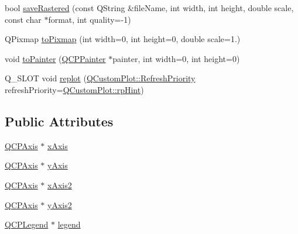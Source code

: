 \begin{DoxyCompactItemize}
\item 
bool \mbox{\hyperlink{class_q_custom_plot_ab528b84cf92baabe29b1d0ef2f77c93e}{save\+Rastered}} (const Q\+String \&file\+Name, int width, int height, double scale, const char $\ast$format, int quality=-\/1)
\item 
Q\+Pixmap \mbox{\hyperlink{class_q_custom_plot_aabb974d71ce96c137dc04eb6eab844fe}{to\+Pixmap}} (int width=0, int height=0, double scale=1.)
\item 
void \mbox{\hyperlink{class_q_custom_plot_a1be68d5c0f1e086d6374d1340a193fb9}{to\+Painter}} (\mbox{\hyperlink{class_q_c_p_painter}{Q\+C\+P\+Painter}} $\ast$painter, int width=0, int height=0)
\item 
Q\+\_\+\+S\+L\+OT void \mbox{\hyperlink{class_q_custom_plot_a606fd384b2a637ce2c24899bcbde77d6}{replot}} (\mbox{\hyperlink{class_q_custom_plot_a45d61392d13042e712a956d27762aa39}{Q\+Custom\+Plot\+::\+Refresh\+Priority}} refresh\+Priority=\mbox{\hyperlink{class_q_custom_plot_a45d61392d13042e712a956d27762aa39adfa1f2387617168d9299f4c8ad15b332}{Q\+Custom\+Plot\+::rp\+Hint}})
\end{DoxyCompactItemize}
\subsection*{Public Attributes}
\begin{DoxyCompactItemize}
\item 
\mbox{\hyperlink{class_q_c_p_axis}{Q\+C\+P\+Axis}} $\ast$ \mbox{\hyperlink{class_q_custom_plot_a9a79cd0158a4c7f30cbc702f0fd800e4}{x\+Axis}}
\item 
\mbox{\hyperlink{class_q_c_p_axis}{Q\+C\+P\+Axis}} $\ast$ \mbox{\hyperlink{class_q_custom_plot_af6fea5679725b152c14facd920b19367}{y\+Axis}}
\item 
\mbox{\hyperlink{class_q_c_p_axis}{Q\+C\+P\+Axis}} $\ast$ \mbox{\hyperlink{class_q_custom_plot_ada41599f22cad901c030f3dcbdd82fd9}{x\+Axis2}}
\item 
\mbox{\hyperlink{class_q_c_p_axis}{Q\+C\+P\+Axis}} $\ast$ \mbox{\hyperlink{class_q_custom_plot_af13fdc5bce7d0fabd640f13ba805c0b7}{y\+Axis2}}
\item 
\mbox{\hyperlink{class_q_c_p_legend}{Q\+C\+P\+Legend}} $\ast$ \mbox{\hyperlink{class_q_custom_plot_a4eadcd237dc6a09938b68b16877fa6af}{legend}}
\end{DoxyCompactItemize}
